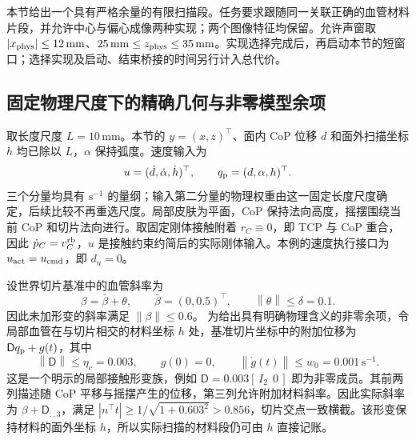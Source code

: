 \documentclass[11pt,a4paper]{article}
\numberwithin{equation}{section}
\theoremstyle{definition}
\newcommand{\norm}[1]{\left\lVert#1\right\rVert}
\begin{document}
本节给出一个具有严格余量的有限扫描段。任务要求跟随同一关联正确的血管材料片段，并允许中心与偏心成像两种实现；两个图像特征均保留。允许声窗取 $|x_{\rm phys}|\le12\,\mathrm{mm}$、$25\,\mathrm{mm}\le z_{\rm phys}\le35\,\mathrm{mm}$。实现选择完成后，再启动本节的短窗口；选择实现及启动、结束桥接的时间另行计入总代价。

\subsection{固定物理尺度下的精确几何与非零模型余项}
取长度尺度 $L=10\,\mathrm{mm}$。本节的 $y=(x,z)^\top$、面内 CoP 位移 $d$ 和面外扫描坐标 $h$ 均已除以 $L$，$\alpha$ 保持弧度。速度输入为
\begin{equation}
 u=(\dot d,\dot\alpha,\dot h)^\top,
 \qquad q_{\rm p}=(d,\alpha,h)^\top.
 \label{rev:example-units}
\end{equation}
三个分量均具有 $\mathrm{s}^{-1}$ 的量纲；输入第二分量的物理权重由这一固定长度尺度确定，后续比较不再重选尺度。局部皮肤为平面，CoP 保持法向高度，摇摆围绕当前 CoP 和切片法向进行。取固定刚体接触附着 $r_C\equiv0$，即 TCP 与 CoP 重合，因此 $\dot p_C=v_C^{\rm rb}$，$u$ 是接触约束约简后的实际刚体输入。本例的速度执行接口为 $u_{\rm act}=u_{\rm cmd}$，即 $d_u=0$。

设世界切片基准中的血管斜率为
\begin{equation}
 \beta=\bar\beta+\theta,\qquad
 \bar\beta=(0,0.5)^\top,\qquad \norm{\theta}\le\delta=0.1.
 \label{rev:example-slope}
\end{equation}
因此未加形变的斜率满足 $\norm{\beta}\le0.6$。
为给出具有明确物理含义的非零余项，令局部血管在与切片相交的材料坐标 $h$ 处，基准切片坐标中的附加位移为 $\mathsf Dq_{\rm p}+g(t)$，其中
\begin{equation}
 \norm{\mathsf D}\le\eta_c=0.003,
 \qquad g(0)=0,
 \qquad\norm{\dot g(t)}\le w_0=0.001\,\mathrm{s}^{-1}.
 \label{rev:example-contact-error}
\end{equation}
这是一个明示的局部接触形变族，例如
$\mathsf D=0.003[\,I_2\ \ 0\,]$ 即为非零成员。其前两列描述随 CoP 平移与摇摆产生的位移，第三列允许附加材料斜率。因此实际斜率为 $\beta+\mathsf D_{:,3}$，满足
$|n^\top t|\ge1/\sqrt{1+0.603^2}>0.856$，切片交点一致横截。该形变保持材料的面外坐标 $h$，所以实际扫描的材料段仍可由 $h$ 直接记账。
\end{document}
